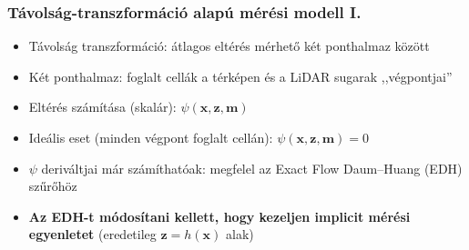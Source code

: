 \documentclass{beamer}
\begin{document}
\begin{frame}
    \frametitle{Távolság-transzformáció alapú mérési modell I.}
    \begin{itemize}[<+->]
        \item Távolság transzformáció: átlagos eltérés mérhető két ponthalmaz között
        \item Két ponthalmaz: foglalt cellák a térképen és a LiDAR sugarak ,,végpontjai''
        \item Eltérés számítása (skalár): $\psi(\mathbf{x},\mathbf{z},\mathbf{m})$
        \item Ideális eset (minden végpont foglalt cellán): $\psi(\mathbf{x},\mathbf{z},\mathbf{m}) = 0$
        \item $\psi$ deriváltjai már számíthatóak: megfelel az Exact Flow Daum--Huang (EDH) szűrőhöz
        \item \textbf{Az EDH-t módosítani kellett, hogy kezeljen implicit mérési egyenletet} (eredetileg $\mathbf{z} = h(\mathbf{x})$ alak)
    \end{itemize}
\end{frame}
\end{document}
